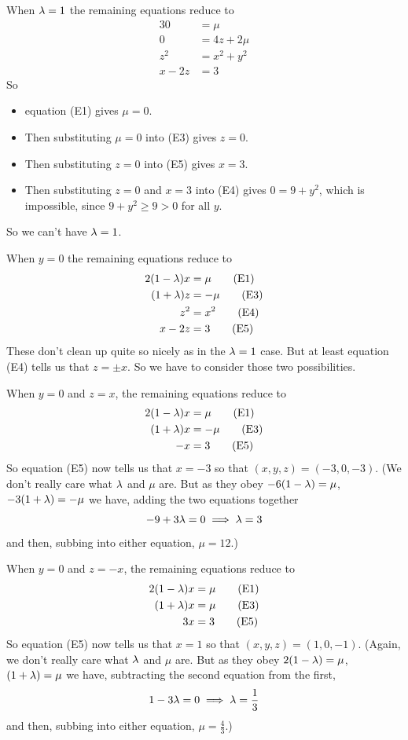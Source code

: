 \begin{eg}
\medskip
{} 
When $\lambda=1$ the remaining equations reduce to
\begin{alignat*}{3}
0&=\mu  \tag{E1} \\
0&=4z + 2 \mu  \tag{E3} \\
z^2&=x^2+y^2 \tag{E4} \\
x-2z&=3 \tag{E5}
\end{alignat*}
So
\begin{itemize}\itemsep1pt \parskip0pt 
\item
equation (E1) gives $\mu=0$.
\item
Then substituting $\mu=0$ into (E3) gives $z=0$.
\item
Then substituting $z=0$ into (E5) gives $x=3$.
\item
Then substituting $z=0$ and $x=3$ into (E4) gives $0=9+y^2$,
which is impossible, since $9+y^2\ge 9>0$ for all $y$.
\end{itemize}
So we can't have $\lambda=1$.

\medskip
{} 
When $y=0$ the remaining equations reduce
to
\begin{alignat*}{3}
2(1-\lambda)x &= \mu  \tag{E1} \\
(1+\lambda)z&= -\mu  \tag{E3} \\
z^2&=x^2 \tag{E4} \\
x-2z&=3 \tag{E5}
\end{alignat*}
These don't clean up quite so nicely as in the $\lambda=1$ case.
But at least equation (E4) tells us that $z=\pm x$. So we have
to consider those two possibilities.

\medskip
{} 
When $y=0$ and $z=x$, the remaining equations reduce to 
\begin{alignat*}{3}
2(1-\lambda)x &= \mu  \tag{E1} \\
(1+\lambda)x&= -\mu  \tag{E3} \\
-x&=3 \tag{E5}
\end{alignat*}
So equation (E5) now tells us that $x=-3$ so that
$
(x,y,z)=(-3,0,-3)
$.
(We don't really care what $\lambda$ and $\mu$ are. But as they
obey $-6(1-\lambda)=\mu$, $-3(1+\lambda)=-\mu$ we have, adding the two equations
together
\begin{equation*}
-9+3\lambda=0 \implies \lambda=3
\end{equation*}
and then, subbing into either equation, $\mu=12$.)

\medskip
{} 
When $y=0$ and $z=-x$, the 
remaining equations reduce to
\begin{alignat*}{3}
2(1-\lambda)x &= \mu  \tag{E1} \\
(1+\lambda)x&= \mu  \tag{E3} \\
3x&=3 \tag{E5}
\end{alignat*}
So equation (E5) now tells us that $x=1$ so that
$
(x,y,z)=(1,0,-1)
$.
(Again, we don't really care what $\lambda$ and $\mu$ are. But as they
obey $2(1-\lambda)=\mu$, $(1+\lambda)=\mu$ we have, subtracting the second 
equation from the first, 
\begin{equation*}
1-3\lambda=0
\implies \lambda=\frac{1}{3}
\end{equation*}
and then, subbing into either equation, $\mu=\frac{4}{3}$.)


\end{eg}
